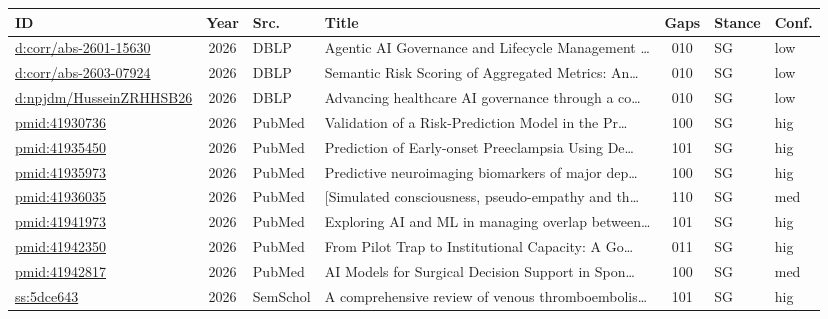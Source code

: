 \begin{table}[p]
  \centering
  \scriptsize
  \setlength{\tabcolsep}{3pt}
  \renewcommand{\arraystretch}{1.05}
  \begin{tabularx}{\linewidth}{p{2.2cm} c p{1.4cm} X c p{1cm} p{0.7cm}}
    \toprule
    \textbf{ID} & \textbf{Year} & \textbf{Src.} & \textbf{Title} & \textbf{Gaps} & \textbf{Stance} & \textbf{Conf.} \\
    \midrule
  \href{https://dblp.org/rec/journals/corr/abs-2601-15630}{d:corr/abs-2601-15630} & 2026 & DBLP & Agentic AI Governance and Lifecycle Management \ldots & 010 & SG & low \\
  \href{https://dblp.org/rec/journals/corr/abs-2603-07924}{d:corr/abs-2603-07924} & 2026 & DBLP & Semantic Risk Scoring of Aggregated Metrics: An\ldots & 010 & SG & low \\
  \href{https://dblp.org/rec/journals/npjdm/HusseinZRHHSB26}{d:npjdm/HusseinZRHHSB26} & 2026 & DBLP & Advancing healthcare AI governance through a co\ldots & 010 & SG & low \\
  \href{https://pubmed.ncbi.nlm.nih.gov/41930736/}{pmid:41930736} & 2026 & PubMed & Validation of a Risk-Prediction Model in the Pr\ldots & 100 & SG & hig \\
  \href{https://pubmed.ncbi.nlm.nih.gov/41935450/}{pmid:41935450} & 2026 & PubMed & Prediction of Early-onset Preeclampsia Using De\ldots & 101 & SG & hig \\
  \href{https://pubmed.ncbi.nlm.nih.gov/41935973/}{pmid:41935973} & 2026 & PubMed & Predictive neuroimaging biomarkers of major dep\ldots & 100 & SG & hig \\
  \href{https://pubmed.ncbi.nlm.nih.gov/41936035/}{pmid:41936035} & 2026 & PubMed & [Simulated consciousness, pseudo-empathy and th\ldots & 110 & SG & med \\
  \href{https://pubmed.ncbi.nlm.nih.gov/41941973/}{pmid:41941973} & 2026 & PubMed & Exploring AI and ML in managing overlap between\ldots & 101 & SG & hig \\
  \href{https://pubmed.ncbi.nlm.nih.gov/41942350/}{pmid:41942350} & 2026 & PubMed & From Pilot Trap to Institutional Capacity: A Go\ldots & 011 & SG & hig \\
  \href{https://pubmed.ncbi.nlm.nih.gov/41942817/}{pmid:41942817} & 2026 & PubMed & AI Models for Surgical Decision Support in Spon\ldots & 100 & SG & med \\
  \href{https://www.semanticscholar.org/paper/5dce6433c29e6bc88dd3537b06eae793c41e80c5}{ss:5dce643} & 2026 & SemSchol & A comprehensive review of venous thromboembolis\ldots & 101 & SG & hig \\

\end{tabularx}
\end{table}
